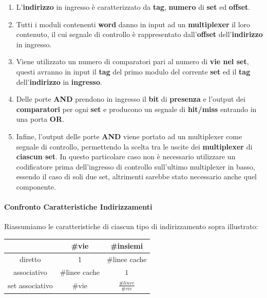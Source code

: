 \documentclass{article}
\begin{document}
\begin{enumerate}
\begin{enumerate}
        \newpage
        
        \item L'\textbf{indirizzo} in ingresso è caratterizzato da \textbf{tag}, \textbf{numero} di \textbf{set} ed \textbf{offset}.
        \item Tutti i moduli contenenti \textbf{word} danno in input ad un \textbf{multiplexer} il loro contenuto, il cui segnale di controllo è rappresentato dall'\textbf{offset} dell'\textbf{indirizzo} in ingresso.
        \item Viene utilizzato un numero di comparatori pari al numero di \textbf{vie nel set}, questi avranno in input il \textbf{tag} del primo modulo del corrente \textbf{set} ed il \textbf{tag} dell'\textbf{indirizzo} in \textbf{ingresso}.
        \item Delle porte \textbf{AND} prendono in ingresso il \textbf{bit} di \textbf{presenza} e l'output dei \textbf{comparatori} per ogni \textbf{set} e producono un segnale di \textbf{hit/miss} entrando in una porta \textbf{OR}.
        \item Infine, l'output delle porte \textbf{AND} viene portato ad un multiplexer come segnale di controllo, permettendo la scelta tra le uscite dei \textbf{multiplexer} di \textbf{ciascun set}. In questo particolare caso non è necessario utilizzare un codificatore prima dell'ingresso di controllo sull'ultimo multiplexer in basso, essendo il caso di soli due set, altrimenti sarebbe stato necessario anche quel componente.
    \end{enumerate}
    
\end{enumerate}

\vspace*{15px}

\paragraph{Confronto Caratteristiche Indirizzamenti} Riassumiamo le caratteristiche di ciascun tipo di indirizzamento sopra illustrato:

\vspace*{20px}

\begin{center}
\begin{tabular}{ |c|c c| } %
 \hline
  & \#vie & \#insiemi \\ 
 \hline
 diretto & 1 & \#linee cache \\ 
 associativo & \#linee cache & $1$ \\
 set associativo & \#vie & $\frac{\#linee}{\#vie}$ \\
 \hline
\end{tabular}
\end{center}
\end{document}
